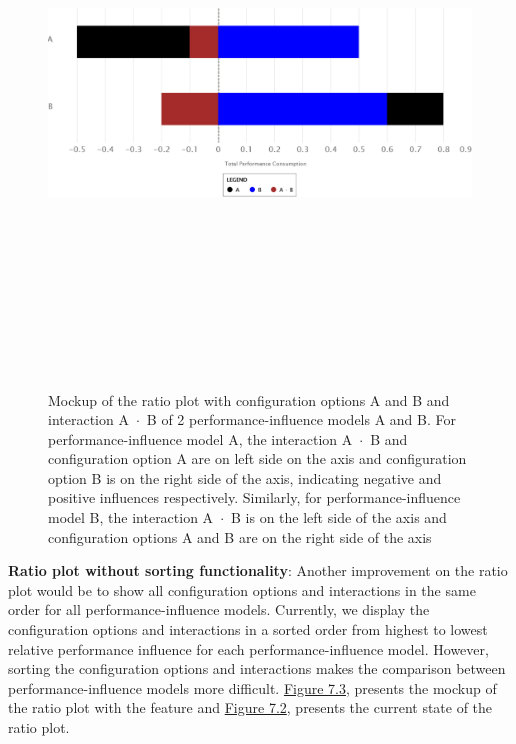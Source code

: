 \begin{myindentpar}{0cm}
\begin{figure}[ht]
\centering
\label{posNegAfter}
\includegraphics[width=15cm,height=15cm,keepaspectratio,]{pics/ratio_plot_positvie_negative_after.pdf}
\caption[Ratio plot with axis between positive and negative influences]{Mockup of the ratio plot with configuration options A and B and interaction \mbox{A $\cdot$ B} of 2 performance-influence models A and B. For performance-influence model A, the interaction \mbox{A $\cdot$ B} and configuration option A are on left side on the axis and configuration option B is on the right side of the axis, indicating negative and positive influences respectively. Similarly, for performance-influence model B, the interaction \mbox{A $\cdot$ B} is on the left side of the axis and configuration options A and B are on the right side of the axis }
\end{figure}


\textbf{Ratio plot without sorting functionality}:  Another improvement on the ratio plot would be to show all configuration options and interactions in the same order for all performance-influence models. Currently, we display the configuration options and interactions in a sorted order from highest to lowest relative performance influence for each performance-influence model. However, sorting the configuration options and interactions makes the comparison between performance-influence models more difficult.  \hyperref[sameOrderAfter]{Figure 7.3},  presents the mockup of the ratio plot with the feature and  \hyperref[posNegBefore]{Figure 7.2}, presents the current state of the ratio plot.


\end{myindentpar}

